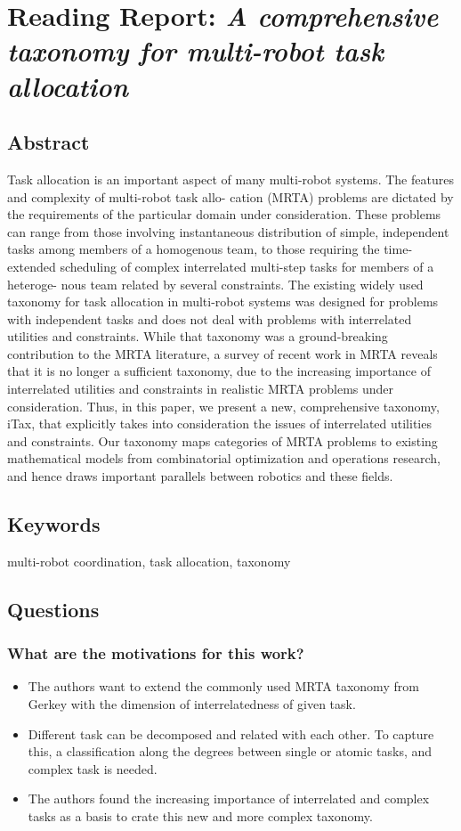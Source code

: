 \documentclass{article}
\begin{document}
\section{Reading Report: \emph{A comprehensive taxonomy for multi-robot task allocation}}
\cite{Korsah2013}

\subsection*{Abstract}
Task allocation is an important aspect of many multi-robot systems. The features and complexity of multi-robot task allo-
cation (MRTA) problems are dictated by the requirements of the particular domain under consideration. These problems
can range from those involving instantaneous distribution of simple, independent tasks among members of a homogenous
team, to those requiring the time-extended scheduling of complex interrelated multi-step tasks for members of a heteroge-
nous team related by several constraints. The existing widely used taxonomy for task allocation in multi-robot systems was
designed for problems with independent tasks and does not deal with problems with interrelated utilities and constraints.
While that taxonomy was a ground-breaking contribution to the MRTA literature, a survey of recent work in MRTA reveals
that it is no longer a sufficient taxonomy, due to the increasing importance of interrelated utilities and constraints in
realistic MRTA problems under consideration. Thus, in this paper, we present a new, comprehensive taxonomy, iTax, that
explicitly takes into consideration the issues of interrelated utilities and constraints. Our taxonomy maps categories of
MRTA problems to existing mathematical models from combinatorial optimization and operations research, and hence
draws important parallels between robotics and these fields.

\subsection*{Keywords}
multi-robot coordination, task allocation, taxonomy

\subsection*{Questions}
\subsubsection*{What are the motivations for this work?}
\begin{itemize}
    \item The authors want to extend the commonly used MRTA taxonomy from Gerkey \cite{Gerkey2004} with the dimension of interrelatedness of given task. 
    \item Different task can be decomposed and related with each other. To capture this, a classification along the degrees between single or atomic tasks, and complex task is needed.
    \item The authors found the increasing importance of interrelated and complex tasks as a basis to crate this new and more complex taxonomy.
\end{itemize}
\end{document}
